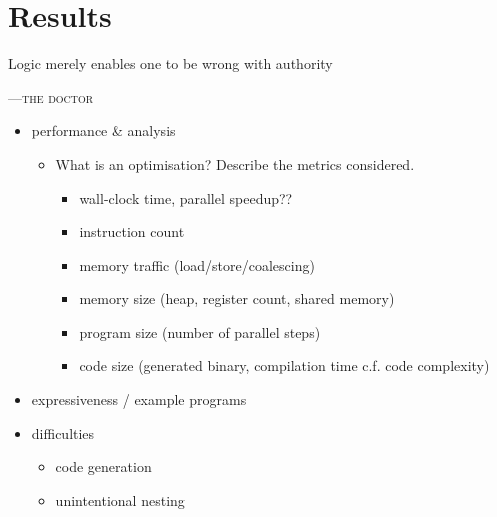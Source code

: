 %
%

\chapter{Results}
\label{ch:results}


\epigraph{Logic merely enables one to be wrong with authority}%
{\textsc{---the doctor}} %

\begin{itemize}
    \item performance \& analysis
    \begin{itemize}
      \item What is an optimisation? Describe the metrics considered.
        \begin{itemize}
          \item wall-clock time, parallel speedup??
          \item instruction count
          \item memory traffic (load/store/coalescing)
          \item memory size (heap, register count, shared memory)
          \item program size (number of parallel steps)
          \item code size (generated binary, compilation time c.f. code complexity)
        \end{itemize}
    \end{itemize}

    \item expressiveness / example programs
    \item difficulties
    \begin{itemize}
        \item code generation
        \item unintentional nesting
    \end{itemize}
\end{itemize}

